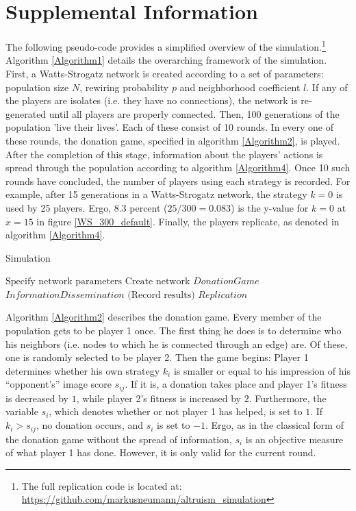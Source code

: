 \documentclass[12pt]{article}
\begin{document}
\newpage




\newpage
\section*{Supplemental Information}
The following pseudo-code provides a simplified overview of the simulation.\footnote{The full replication code is located at: \url{https://github.com/markusneumann/altruism_simulation}} Algorithm \ref{Algorithm1} details the overarching framework of the simulation. First, a Watts-Strogatz network is created according to a set of parameters: population size $N$, rewiring probability $p$ and neighborhood coefficient $l$. If any of the players are isolates (i.e. they have no connections), the network is re-generated until all players are properly connected. Then, 100 generations of the population 'live their lives'. Each of these consist of 10 rounds. In every one of these rounds, the donation game, specified in algorithm \ref{Algorithm2}, is played. After the completion of this stage, information about the players' actions is spread through the population according to algorithm \ref{Algorithm4}. Once 10 such rounds have concluded, the number of players using each strategy is recorded. For example, after 15 generations in a Watts-Strogatz network, the strategy $k=0$ is used by 25 players. Ergo, 8.3 percent ($25/300=0.083$) is the y-value for $k=0$ at $x=15$ in figure \ref{WS_300_default}. Finally, the players replicate, as denoted in algorithm \ref{Algorithm4}.

\begin{algorithm}
	\caption{Simulation}
	\label{Algorithm1}
	\begin{algorithmic}[1]
		\State $\text{Specify network parameters}$
		\State $\text{Create network}$
		\State $DonationGame$
		\State $InformationDissemination$
		\EndFor
		\State $\text{(Record results)}$
		\State $Replication$
		\EndFor
		\EndFunction
	\end{algorithmic}
\end{algorithm}

Algorithm \ref{Algorithm2} describes the donation game. Every member of the population gets to be player 1 once. The first thing he does is to determine who his neighbors (i.e. nodes to which he is connected through an edge) are. Of these, one is randomly selected to be player 2. Then the game begins: Player 1 determines whether his own strategy $k_i$ is smaller or equal to his impression of his ``opponent's'' image score $s_{ij}$. If it is, a donation takes place and player 1's fitness is decreased by $1$, while player 2's fitness is increased by $2$. Furthermore, the variable $s_i$, which denotes whether or not player 1 has helped, is set to $1$. If $k_i>s_{ij}$, no donation occurs, and $s_i$ is set to $-1$. Ergo, as in the classical form of the donation game without the spread of information, $s_i$ is an objective measure of what player 1 has done. However, it is only valid for the current round.
\end{document}

